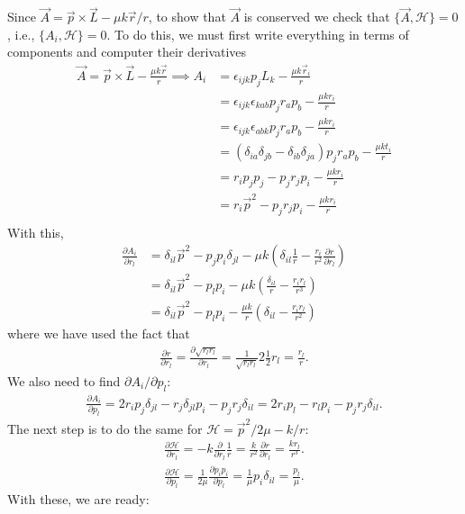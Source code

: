 \documentclass{article}
\theoremstyle{definition}
\newcommand{\p}{\partial}
\newcommand{\ham}{\mathcal{H}}
\newcommand{\f}[2]{\frac{#1}{#2}}
\newcommand{\lp}{\left(}
\newcommand{\rp}{\right)}
\begin{document}
\begin{enumerate}[label=(\alph*)]
	
	Since $\vec{A} = \vec{p}\times \vec{L} - \mu k\vec{r} /r$, to show that $\vec{A}$ is conserved we check that $\{ \vec{A} , \ham\} = 0$, i.e., $\{ A_i,\ham \} = 0$. To do this, we must first write everything in terms of components and computer their derivatives
	\begin{align*}
	\vec{A} = \vec{p}\times \vec{L} - \f{\mu k \vec{r}}{r} \implies A_i &=  \epsilon_{ijk}p_jL_k - \f{\mu k \vec{r}_i}{r}\\
	&= \epsilon_{ijk}\epsilon_{kab} p_jr_ap_b - \f{\mu k r_i}{r} \\ 
	&= \epsilon_{ijk}\epsilon_{abk} p_jr_ap_b - \f{\mu k r_i}{r} \\ 
	&= (\delta_{ia}\delta_{jb} - \delta_{ib}\delta_{ja})p_jr_a p_b - \f{\mu k t_i}{r} \\ 
	&= r_i p_jp_j  - p_j r_j p_i - \f{\mu k r_i}{r} \\
	&= r_i \vec{p}^2  - p_j r_j p_i - \f{\mu k r_i}{r} \\
	\end{align*}
	With this, 
	\begin{align*}
	\f{\p A_i}{\p r_l} &= \delta_{il}\vec{p}^2  - p_jp_i \delta_{jl} - \mu k \lp \delta_{il}\f{1}{r} - \f{r_i}{r^2}\f{\p r}{\p r_l} \rp\\ 
	&= \delta_{il} \vec{p}^2  - p_l p_i - \mu k \lp \f{\delta_{il}}{r} - \f{r_ir_l}{r^3} \rp \\
	&= \delta_{il} \vec{p}^2 - p_l p_i - \f{\mu k}{r} \lp \delta_{il} - \f{r_ir_l}{r^2} \rp 
	\end{align*}
	where we have used the fact that
	\begin{align*}
	\f{\p r}{\p r_l} = \f{\p \sqrt{r_l r_l}}{\p r_l} = \f{1}{\sqrt{r_lr_l}}2\f{1}{2}r_l = \f{r_l}{r}.
	\end{align*}
	We also need to find $\p A_i/\p p_l$:
	\begin{align*}
	\f{\p A_i}{\p p_l} = 2r_i p_j \delta_{jl} - r_j\delta_{jl}p_i- p_j r_j \delta_{il} = 2 r_i p_l - r_lp_i - p_j r_j \delta_{il}.
	\end{align*}
	The next step is to do the same for $\ham = \vec{p}^2/2\mu - k/r $:
	\begin{align*}
	\f{\p \ham}{\p r_l} = -k\f{\p}{\p r_l}\f{1}{r} = \f{k}{r^2}\f{\p r}{\p r_l} = \f{kr_l}{r^3}.
	\end{align*}
	\begin{align*}
	\f{\p \ham}{\p p_l} = \f{1}{2\mu} \f{\p p_i p_i}{\p p_l} = \f{1}{\mu} p_i \delta_{il} = \f{p_l}{\mu}.
	\end{align*}
	With these, we are ready:

\end{enumerate}
\end{document}

